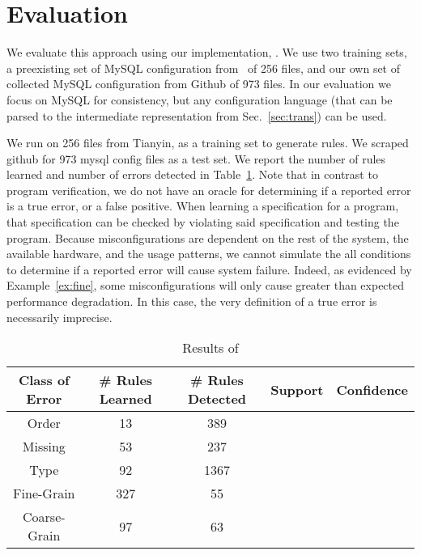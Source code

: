 
\section{Evaluation}

We evaluate this approach using our implementation, \app.
We use two training sets, a preexisting set of MySQL configuration from~\cite{xu15systems} of 256 files,
 and our own set of collected MySQL configuration from Github of 973 files.
In our evaluation we focus on MySQL for consistency, but any configuration language (that can be parsed to the intermediate representation from Sec.~\ref{sec:trans}) can be used.

We run \app on 256 files from Tianyin, as a training set to generate rules.
We scraped github for 973 mysql config files as a test set.
We report the number of rules learned and number of errors detected in Table~\ref{table:learning}.
Note that in contrast to program verification, we do not have an oracle for determining if a reported error is a true error, or a false positive.
When learning a specification for a program, that specification can be checked by violating said specification and testing the program.
Because misconfigurations are dependent on the rest of the system, the available hardware, and the usage patterns, we cannot simulate the all conditions to determine if a reported error will cause system failure.
Indeed, as evidenced by Example~\ref{ex:fine}, some misconfigurations will only cause greater than expected performance degradation.
In this case, the very definition of a true error is necessarily imprecise.

\begin{table}[h]
\centering
\caption{Results of \app}
\label{table:learning}
\setlength{\tabcolsep}{0.5em}
\begin{tabular}{|c|c|c|c|c|}
\hline
{\bf Class of Error } & {\bf \# Rules Learned} & {\bf \# Rules Detected} & {\bf Support} & {\bf Confidence}\\ 
\hline
\hline
Order        & 13  & 389  &  & \\ 
Missing      & 53  & 237  &  & \\ 
Type         & 92  & 1367 &  & \\ 
Fine-Grain   & 327 & 55   &  & \\ 
Coarse-Grain & 97  & 63   &  & \\ 
\hline 
\end{tabular}
\end{table}

